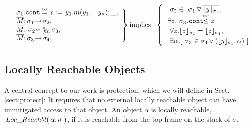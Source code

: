{{{\begin{lemma}
 $  
   \left. %
   \begin{array}{l}  \ \strut \ \ \sigma_1.\prg{cont}\txteq x:= y_0.m(y_1,...y_n);\_ ,\\
    \ \strut \ \  \leadstoOrig {\Mtwo} {\sigma_1}   {\sigma_2} , \\
     \ \strut \ \  \leadstoBoundedStarFin  {\Mtwo}  {\sigma_2}  {\sigma_3}, \\
  \ \strut \ \  \leadstoOrig {\Mtwo} {\sigma_3}   {\sigma_4}, 
    \end{array} 
\right \}
 \mbox{implies} \ \ 
  \begin{cases}
     \ \strut \ \  \sigma_2 \in \PushS  {\interpret {\sigma_1} {y}} {\sigma_1},\\
     \ \strut \  \exists z.\ \sigma_3.\prg{cont}{\txtin z} \\
       \ \strut \ \       \forall z. \interpret {\sigma_1} {z} = \interpret {\sigma_4} {z},\\  
        \ \strut \ \       \exists \overline \alpha. [\ \sigma_3 \in  \PushSLong  {( {\interpret {\sigma_1} {y}},{\overline \alpha})} {\sigma_4} \ ]
    \end{cases} 
$
 \end{lemma}

}
  \subsection{{{Locally} Reachable  Objects}}

 {A central concept to our work is %
protection, which we will define in   Sect. \ref{sect:protect}: It requires that no external locally reachable object  
can have unmitigated access to that object.}
%
%
An object $\alpha$ is  locally reachable, $ \,Loc\_Reachbl(\,\alpha,\sigma\,) $, if it is reachable from the top frame on the stack of $\sigma$.
 
}}
